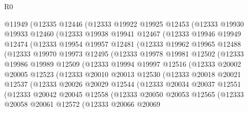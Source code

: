 \begin{lexlean}{R0}
\begin{coremodule}
    @11949
      (@12335
        @12446
        (@12333
          @19922
          @19925
          @12453
          (@12333
            @19930
            @19933
            @12460
            (@12333
              @19938
              @19941
              @12467
              (@12333
                @19946
                @19949
                @12474
                (@12333
                  @19954
                  @19957
                  @12481
                  (@12333
                    @19962
                    @19965
                    @12488
                    (@12333
                      @19970
                      @19973
                      @12495
                      (@12333
                        @19978
                        @19981
                        @12502
                        (@12333
                          @19986
                          @19989
                          @12509
                          (@12333
                            @19994
                            @19997
                            @12516
                            (@12333
                              @20002
                              @20005
                              @12523
                              (@12333
                                @20010
                                @20013
                                @12530
                                (@12333
                                  @20018
                                  @20021
                                  @12537
                                  (@12333
                                    @20026
                                    @20029
                                    @12544
                                    (@12333
                                      @20034
                                      @20037
                                      @12551
                                      (@12333
                                        @20042
                                        @20045
                                        @12558
                                        (@12333
                                          @20050
                                          @20053
                                          @12565
                                          (@12333
                                            @20058
                                            @20061
                                            @12572
                                            (@12333
                                              @20066
                                              @20069

\end{coremodule}
\end{lexlean}
